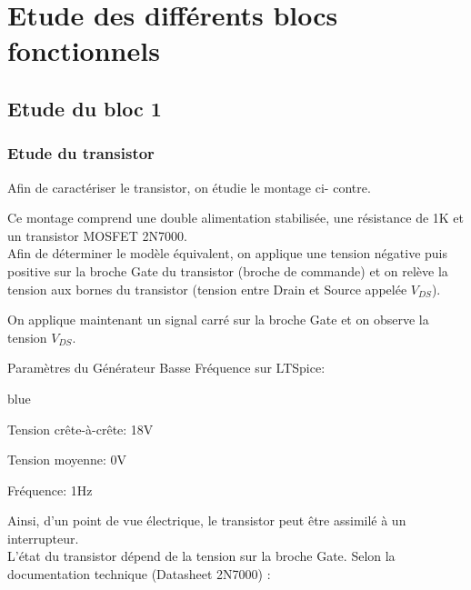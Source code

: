 

\chapter{Etude des différents blocs fonctionnels}
\section{Etude du bloc 1}



\subsection{Etude du transistor}


Afin de caractériser le transistor, on étudie le montage ci- contre.


Ce montage comprend une double alimentation stabilisée, une résistance de 1K et un transistor MOSFET 2N7000.\\

Afin de déterminer le modèle équivalent, on applique une tension négative puis positive sur la broche Gate du transistor (broche de commande) 
et on relève la tension aux bornes du transistor (tension entre Drain et Source appelée $V_{DS}$).\\



On applique maintenant un signal carré sur la broche Gate et on observe la tension $V_{DS}$.

Paramètres du Générateur Basse Fréquence sur LTSpice:

\begin{items}{blue}{\Bullet}
\item Tension crête-à-crête: 18V
\item Tension moyenne: 0V
\item Fréquence: 1Hz
\end{items}



Ainsi, d’un point de vue électrique, le transistor peut être assimilé à un interrupteur.\\
L’état du transistor dépend de la tension sur la broche Gate. Selon la documentation technique (Datasheet 2N7000) :


